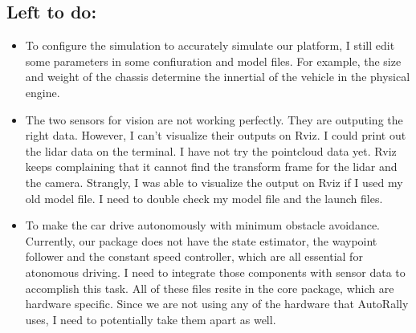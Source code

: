 \documentclass[compsoc,draftclsnofoot,onecolumn,10pt]{IEEEtran}
\begin{document}
\subsection{Left to do:}
\begin{itemize}
	\item To configure the simulation to accurately simulate our platform, I still edit some parameters in some confiuration and model files. For example, the size and weight of the chassis determine the innertial of the vehicle in the physical engine.  
	\item The two sensors for vision are not working perfectly. They are outputing the right data. However, I can't visualize their outputs on Rviz. I could print out the lidar data on the terminal. I have not try the pointcloud data yet. Rviz keeps complaining that it cannot find the transform frame for the lidar and the camera. Strangly, I was able to visualize the output on Rviz if I used my old model file. I need to double check my model file and the launch files. 
	\item To make the car drive autonomously with minimum obstacle avoidance. Currently, our package does not have the state estimator, the waypoint follower and the constant speed controller, which are all essential for atonomous driving. I need to integrate those components with sensor data to accomplish this task. All of these files resite in the core package, which are hardware specific. Since we are not using any of the hardware that AutoRally uses, I need to potentially take them apart as well. 
\end{itemize}
\end{document}
